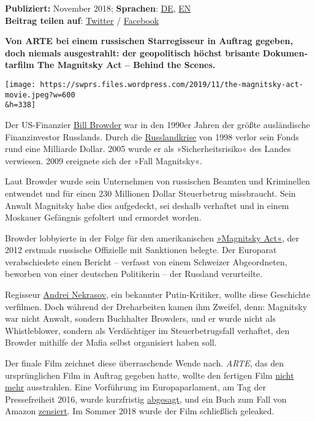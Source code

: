 \textbf{Publiziert:} November 2018; \textbf{Sprachen}:
\href{https://swprs.org/der-fall-magnitsky/}{DE},
\href{https://swprs.org/the-magnitsky-act/}{EN}\\
\textbf{Beitrag teilen auf}:
\href{https://twitter.com/intent/tweet?url=https://swprs.org/der-fall-magnitsky/}{Twitter}
/
\href{https://www.facebook.com/share.php?u=https://swprs.org/der-fall-magnitsky/}{Facebook}

\textbf{Von ARTE bei einem russischen Star­re­gisseur in Auftrag
gegeben, doch niemals ausgestrahlt: der geopolitisch höchst brisante
Doku­men­tar­film The Magnitsky Act -- Behind the Scenes.}

\texttt{[image: https://swprs.files.wordpress.com/2019/11/the-magnitsky-act-movie.jpeg?w=600\\\&h=338]}

Der US-Finanzier \href{https://en.wikipedia.org/wiki/Bill_Browder}{Bill
Browder} war in den 1990er Jahren der größte ausländische Finanzinvestor
Russlands. Durch die
\href{https://de.wikipedia.org/wiki/Russlandkrise}{Russlandkrise} von
1998 verlor sein Fonds rund eine Milliarde Dollar. 2005 wurde er als
»Sicherheits­risiko« des Landes verwiesen. 2009 ereignete sich der »Fall
Magnitsky«.

Laut Browder wurde sein Unternehmen von russischen Beamten und
Kriminellen entwendet und für einen 230 Millionen Dollar Steuerbetrug
missbraucht. Sein Anwalt Magnitsky habe dies aufgedeckt, sei deshalb
verhaftet und in einem Moskauer Gefängnis gefoltert und ermordet worden.

Browder lobbyierte in der Folge für den amerikanischen
\href{https://en.wikipedia.org/wiki/Magnitsky_Act}{»Magnitsky Act«}, der
2012 erstmals russische Offizielle mit Sanktionen belegte. Der Europarat
verabschiedete einen Bericht -- verfasst von einem Schweizer
Abgeordneten, beworben von einer deutschen Politikerin -- der Russland
verurteilte.

Regisseur \href{https://en.wikipedia.org/wiki/Andrei_Nekrasov}{Andrei
Nekrasov}, ein bekannter Putin-Kritiker, wollte diese Geschichte
verfilmen. Doch während der Dreharbeiten kamen ihm Zweifel, denn:
Magnitsky war nicht Anwalt, sondern Buch­halter Browders, und er wurde
nicht als Whistleblower, sondern als Verdächtiger im Steuer­betrugs­fall
verhaftet, den Browder mithilfe der Mafia selbst organisiert haben soll.

Der finale Film zeichnet diese überraschende Wende nach. \emph{ARTE},
das den ursprünglichen Film in Auftrag gegeben hatte, wollte den
fertigen Film
\href{https://www.heise.de/tp/features/Arte-stoppt-Dokumentation-zum-Fall-Sergej-Magnitzki-3197047.html}{nicht
mehr} ausstrahlen. Eine Vorführung im Europa­parlament, am Tag der
Pressefreiheit 2016, wurde kurzfristig
\href{https://www.heise.de/tp/features/Arte-stoppt-Dokumentation-zum-Fall-Sergej-Magnitzki-3197047.html}{abgesagt},
und ein Buch zum Fall von Amazon
\href{https://thesaker.is/how-my-book-unmasking-bill-browder-was-censored-by-amazon-by-alex-krainer/}{zensiert}.
Im Sommer 2018 wurde der Film schließlich geleaked.

